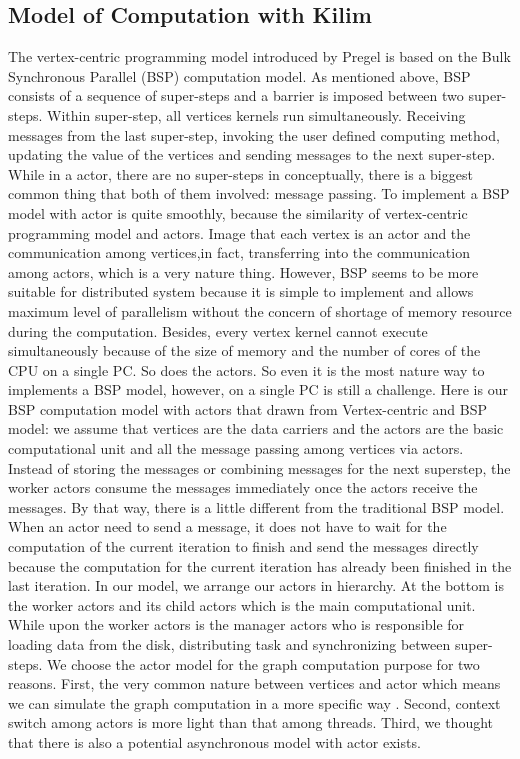 \documentclass[twocolumn,a4paper,10pt]{article}
\begin{document}
\subsection{Model of Computation with Kilim}
The vertex-centric programming model introduced by Pregel is based on the Bulk Synchronous Parallel (BSP) computation model. As mentioned above, BSP consists of a sequence of super-steps and a barrier is imposed between two super-steps. Within super-step, all vertices kernels run simultaneously. Receiving messages from the last super-step, invoking the user defined computing method, updating the value of the vertices and sending messages to the next super-step. While in a actor, there are no super-steps in conceptually, there is a biggest common thing that both of them involved: message passing.
\newline
To implement a BSP model with actor is quite smoothly, because the similarity of vertex-centric programming model and actors. Image that each vertex is an actor and the communication among vertices,in fact, transferring into the communication among actors, which is a very nature thing. However, BSP seems to be more suitable for distributed system because it is simple to implement and allows maximum level of parallelism without the concern of shortage of memory resource during the computation. Besides, every vertex kernel cannot execute simultaneously because of the size of memory and the number of cores of the CPU on a single PC. So does the actors. So even it is the most nature way to implements a BSP model, however, on a single PC is still a challenge.
\newline
Here is our BSP computation model with actors that drawn from Vertex-centric and BSP model: we assume that vertices are the data carriers and the actors are the basic computational unit and all the message passing among vertices via actors. Instead of storing the messages or combining messages for the next superstep, the worker actors consume the messages immediately once the actors receive the messages. By that way, there is a little different from the traditional BSP model. When an actor need to send a message, it does not have to wait for the computation of the current iteration to finish and send the messages directly because the computation for the current iteration has already been finished in the last iteration.
In our model, we arrange our actors in hierarchy. At the bottom is the worker actors and its child actors which is the main computational unit. While upon the worker actors is the manager actors who is responsible for loading data from the disk, distributing task and synchronizing between super-steps.
\newline
We choose the actor model for the graph computation purpose for two reasons. First, the very common nature between vertices and actor which means we can simulate the graph computation in a more specific way . Second, context switch among actors is more light than that among threads. Third, we thought that there is also a potential asynchronous model with actor exists.
\end{document}
